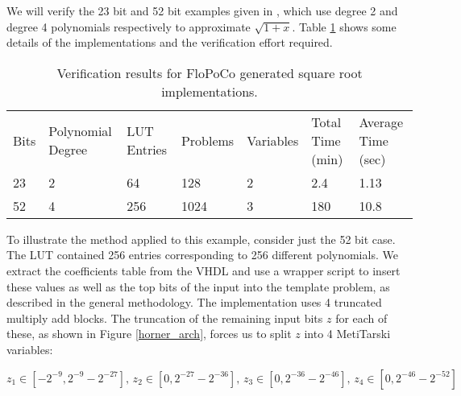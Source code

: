 \documentclass{fac}
\begin{document}
We will verify the 23 bit and 52 bit examples given in \cite{DinJolPas2010-poly}, which use degree 2 and degree 4 polynomials respectively to approximate $\sqrt{1+x}$. Table \ref{flopo_results} shows some details of the implementations and the verification effort required. 

\begin{table}
\centering
\begin{tabular}{|l|l|l|l|l|l|l|}
\hline
Bits & Polynomial Degree & LUT Entries & Problems & Variables & Total Time (min) & Average Time (sec)\\
23 & 2 & 64 & 128 & 2 & 2.4 & 1.13 \\
52 & 4 & 256 & 1024 & 3 & 180 & 10.8\\
\end{tabular}
\caption{Verification results for FloPoCo generated square root implementations.}\label{flopo_results}     
\end{table}

To illustrate the method applied to this example, consider just the 52 bit case. The LUT contained 256 entries corresponding to 256 different polynomials. We extract the coefficients table from the VHDL and use a wrapper script to insert these values as well as the top bits of the input into the template problem, as described in the general methodology. The implementation uses 4 truncated multiply add blocks. The truncation of the remaining input bits $z$ for each of these, as shown in Figure \ref{horner_arch}, forces us to split $z$ into 4 MetiTarski variables:
\begin{center}
\end{center}

\begin{equation*}
    z_1 \in [-2^{-9}, 2^{-9}-2^{-27}], \,
    z_2 \in [0, 2^{-27} - 2^{-36}],\,
    z_3 \in [0, 2^{-36} - 2^{-46}],\,
    z_4 \in [0, 2^{-46} - 2^{-52}]
\end{equation*}
\end{document}
